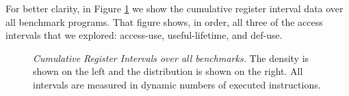 
For better clarity,
in Figure \ref{fig:a_rcum} we show the cumulative 
register interval data over all
benchmark programs.  
That figure shows, in order, all three of the access
intervals that we explored: access-use, useful-lifetime, and def-use.
%
\begin{figure}[tb]
\centering
{}
\caption{{\em Cumulative Register Intervals over all benchmarks.} 
The density is shown on the left and the distribution is shown
on the right.
All intervals are measured in dynamic numbers of executed instructions.}
\label{fig:a_rcum}
\end{figure}
%

